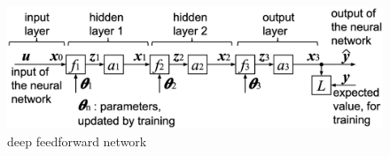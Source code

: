 \documentclass[twocolumn]{article}
\begin{document}
\begin{figure}[!tb]
 \begin{center}
  \begin{minipage}{\hsize}
   \includegraphics[width=\hsize]{fig/deep_feedforward_02.eps}
   \caption{deep feedforward network}
   \label{fig:deep_feedforward}
  \end{minipage}
 \end{center}
\end{figure}
\end{document}
